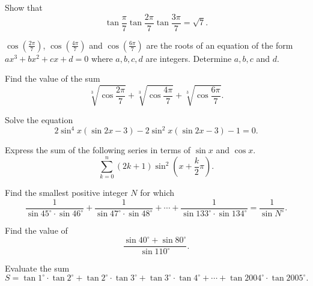 \begin{question} Show that $$\tan{\frac {\pi}7}\tan{\frac {2\pi}7}\tan{\frac {3\pi}7}=\sqrt 7.$$
\end{question}



\begin{question} $\cos\left(\frac{2\pi}{7}\right)$, $\cos\left(\frac{4\pi}{7}\right)$ and $\cos\left(\frac{6\pi}{7}\right)$ are the roots of an equation of the form $ax^3+bx^2+cx+d = 0$ where $a, b, c, d$ are integers. Determine $a, b, c$ and $d$.
\end{question}



\begin{question} Find the value of the sum
\[\sqrt[3]{\cos{\frac{2\pi}{7}}} + \sqrt[3]{\cos\frac{4\pi}{7}} + \sqrt[3]{\cos\frac{6\pi}{7}}.\]
\end{question}



\begin{question} Solve the equation \[2\sin^4x(\sin 2x-3)-2\sin^2x(\sin 2x-3)-1=0.\]
\end{question}



\begin{question} Express the sum of the following series in terms of $\sin x$ and $\cos x.$
\[\sum_{k=0}^n (2k+1)\sin ^ 2 \left(x+\frac{k}{2}\pi\right).\]
\end{question}



\begin{question} Find the smallest positive integer $N$ for which
\[\frac{1}{\sin 45^\circ \cdot  \sin 46^\circ} + \frac{1}{\sin 47^\circ \cdot  \sin 48^\circ} +\cdots +\frac{1}{\sin 133^\circ \cdot  \sin 134^\circ} = \frac{1}{\sin N^\circ}.\]
\end{question}



\begin{question} Find the value of
\[\frac{\sin 40^\circ + \sin 80^\circ}{\sin 110^\circ}.\]
\end{question}


\begin{question} Evaluate the sum \[ S=\tan 1^\circ  \cdot \tan 2^\circ + \tan 2^\circ  \cdot \tan 3^\circ +\tan 3^\circ  \cdot \tan 4^\circ +\cdots + \tan 2004^\circ  \cdot \tan 2005^\circ.\]
\end{question}




